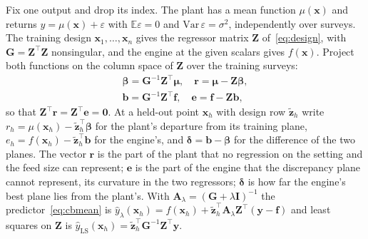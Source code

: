 Fix one output and drop its index. The plant has a mean function $\mu(\mathbf x)$ and returns $y=\mu(\mathbf x)+\varepsilon$
with $\mathbb E\varepsilon=0$ and $\mathrm{Var}\,\varepsilon=\sigma^2$, independently over surveys. The training design
$\mathbf x_1,\dots,\mathbf x_n$ gives the regressor matrix $\mathbf Z$ of~\eqref{eq:design}, with $\mathbf G=\mathbf
Z^{\top}\mathbf Z$ nonsingular, and the engine at the given scalars gives $f(\mathbf x)$. Project both functions on the
column space of $\mathbf Z$ over the training surveys:
\begin{equation}
\begin{gathered}
\boldsymbol\beta=\mathbf G^{-1}\mathbf Z^{\top}\boldsymbol\mu,\quad \mathbf r=\boldsymbol\mu-\mathbf Z\boldsymbol\beta,\\
\mathbf b=\mathbf G^{-1}\mathbf Z^{\top}\mathbf f,\quad \mathbf e=\mathbf f-\mathbf Z\mathbf b,
\end{gathered}
\label{eq:projections}
\end{equation}
so that $\mathbf Z^{\top}\mathbf r=\mathbf Z^{\top}\mathbf e=\mathbf 0$. At a held-out point $\mathbf x_h$ with design row
$\tilde{\mathbf z}_h$ write $r_h=\mu(\mathbf x_h)-\tilde{\mathbf z}_h^{\top}\boldsymbol\beta$ for the plant's departure from its
training plane, $e_h=f(\mathbf x_h)-\tilde{\mathbf z}_h^{\top}\mathbf b$ for the engine's, and
$\boldsymbol\delta=\mathbf b-\boldsymbol\beta$ for the difference of the two planes. The vector $\mathbf r$ is the part of the
plant that no regression on the setting and the feed size can represent; $\mathbf e$ is the part of the engine that the
discrepancy plane cannot represent, its curvature in the two regressors; $\boldsymbol\delta$ is how far the engine's best
plane lies from the plant's. With $\mathbf A_\lambda=(\mathbf G+\lambda\mathbf I)^{-1}$ the predictor~\eqref{eq:cbmean} is
$\hat y_\lambda(\mathbf x_h)=f(\mathbf x_h)+\tilde{\mathbf z}_h^{\top}\mathbf A_\lambda\mathbf Z^{\top}(\mathbf y-\mathbf f)$ and
least squares on $\mathbf Z$ is $\hat y_{\mathrm{LS}}(\mathbf x_h)=\tilde{\mathbf z}_h^{\top}\mathbf G^{-1}\mathbf Z^{\top}\mathbf y$.


